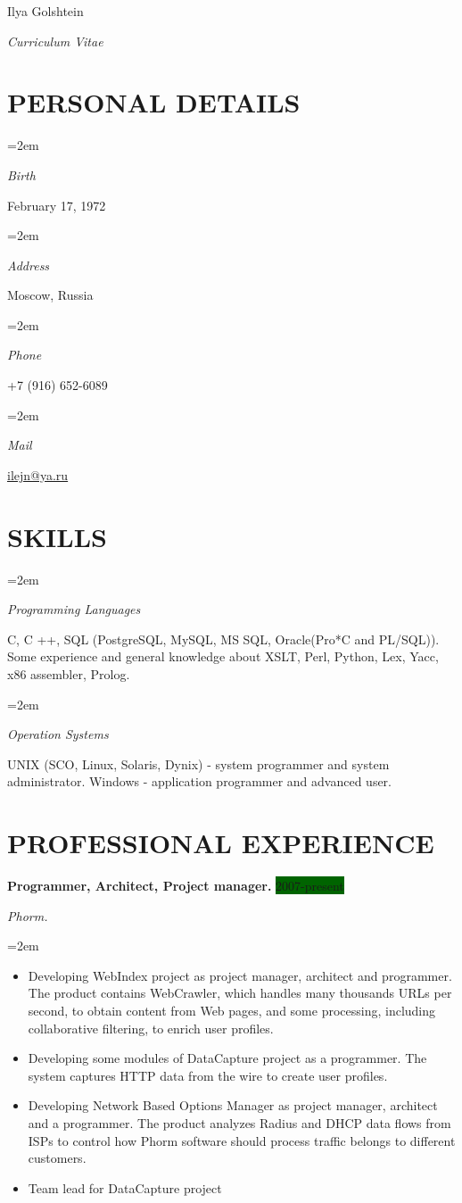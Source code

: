\documentclass[paper=a4,fontsize=11pt]{scrartcl} %
\newlength{\spacebox}
\newcommand{\sepspace}{\vspace*{1em}}       %
\newcommand{\MyName}[1]{ %
        \Huge \usefont{OT1}{phv}{b}{n} \hfill #1
        \par \normalsize \normalfont}
\newcommand{\MySlogan}[1]{ %
        \large \usefont{OT1}{phv}{m}{n}\hfill \textit{#1}
        \par \normalsize \normalfont}
\newcommand{\NewPart}[1]{\section*{\uppercase{#1}}}
\newcommand{\PersonalEntry}[2]{\pagebreak[2]
        \noindent\hangindent=2em\hangafter=0 %
        \parbox{\spacebox}{        %
        \textit{#1}}               %
        \hspace{1.5em} #2 \par}    %
\newcommand{\SkillsEntry}[2]{\pagebreak[2]      %
        \noindent\hangindent=2em\hangafter=0 %
        \parbox{\spacebox}{        %
        \textit{#1}}               %
        \hspace{1.5em} \vspace{1.5em}  \parbox{0.75\textwidth}{#2} \par}    %
\newcommand{\EducationEntry}[4]{\pagebreak[2]
        \noindent \textbf{#1} \hfill      %
        \colorbox{DarkGreen}{%
            \parbox{6em}{%
            \hfill\color{White}#2}} \par  %
        \noindent \textit{#3} \par        %
        \noindent\hangindent=2em\hangafter=0 \small #4 %
        \normalsize \par}
\newcommand{\WorkEntry}[4]{\pagebreak[2]    %
        \noindent \textbf{#1} \hfill      %
        \colorbox{DarkGreen}{\color{White}#2} \par  %
        \noindent \textit{#3} \par        %
        \noindent\hangindent=2em\hangafter=0 \small #4 %
        \normalsize \par         \sepspace}
\begin{document}

\MyName{Ilya Golshtein}
\MySlogan{Curriculum Vitae}

\sepspace


\NewPart{Personal details}{}

\PersonalEntry{Birth}{February 17, 1972}
\PersonalEntry{Address}{Moscow, Russia}
\PersonalEntry{Phone}{+7 (916) 652-6089}
\PersonalEntry{Mail}{\url{ilejn@ya.ru}}

\NewPart{Skills}{}

\SkillsEntry{Programming Languages}{C, C ++, SQL (PostgreSQL, MySQL, MS SQL, Oracle(Pro*C and PL/SQL)). 
  Some experience and general knowledge about XSLT, Perl, Python, Lex, Yacc, x86 assembler, Prolog.
}

\SkillsEntry{Operation Systems} {UNIX (SCO, Linux, Solaris, Dynix) - system programmer and system administrator. Windows - application programmer and advanced user.
}


\NewPart{Professional experience}{}

\WorkEntry{Programmer, Architect, Project manager.}{2007-present}{Phorm.}{
\begin{itemize}  \itemsep0em
\item  Developing WebIndex project as project manager, architect and programmer. The product contains WebCrawler, which handles many thousands URLs per second, to obtain content from Web pages, and some processing, including collaborative filtering, to enrich user profiles.
\item Developing some modules of DataCapture project as a programmer. The system captures HTTP data from the wire to create user profiles.
\item Developing Network Based Options Manager as project manager, architect and a programmer. The product analyzes Radius and DHCP data flows from ISPs to control how Phorm software should process traffic belongs to different customers.
\item Team lead for DataCapture project
\end{itemize}
}
\sepspace
\end{document}
